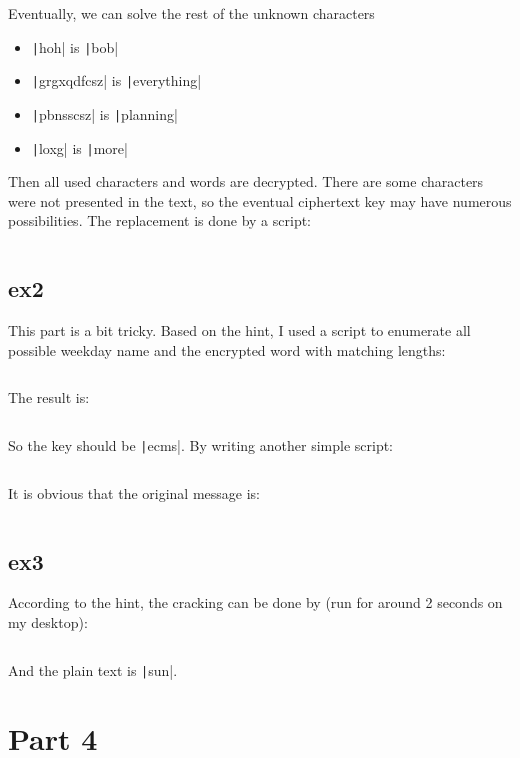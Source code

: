 \documentclass[12pt]{article}
\begin{document}
Eventually, we can solve the rest of the unknown characters

\begin{itemize}
  \item \texttt|hoh| is \texttt|bob|
  \item \texttt|grgxqdfcsz| is \texttt|everything|
  \item \texttt|pbnsscsz| is \texttt|planning|
  \item \texttt|loxg| is \texttt|more|
\end{itemize}

Then all used characters and words are decrypted. There are some characters were not presented in the text, so the eventual ciphertext key may have numerous possibilities. The replacement is done by a script:

\inputminted{python}{exercise/ex1_dec.py}

\subsection{ex2}

This part is a bit tricky. Based on the hint, I used a script to enumerate all possible weekday name and the encrypted word with matching lengths:

\inputminted{python}{exercise/ex2_enum.py}

The result is:

\inputminted{text}{exercise/ex2_enum.result}

So the key should be \texttt|ecms|. By writing another simple script:

\inputminted{python}{exercise/ex2_dec.py}

It is obvious that the original message is:

\inputminted{text}{exercise/ex2.dec}

\subsection{ex3}

According to the hint, the cracking can be done by (run for around 2 seconds on my desktop):

\inputminted{python}{exercise/ex3_crack.py}

And the plain text is \texttt|sun|.

\section{Part 4}
\end{document}
